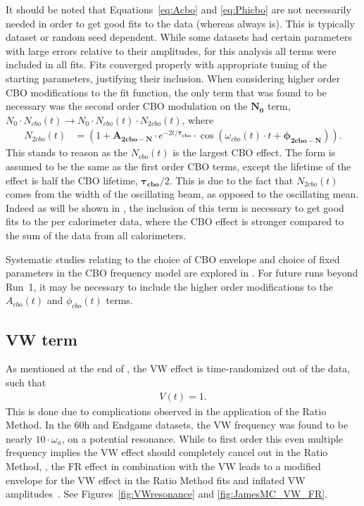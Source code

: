 It should be noted that Equations~\ref{eq:Acbo} and \ref{eq:Phicbo} are not necessarily needed in order to get good fits to the data (whereas  always is). This is typically dataset or random seed dependent. While some datasets had certain parameters with large errors relative to their amplitudes, for this analysis all terms were included in all fits. Fits converged properly with appropriate tuning of the starting parameters, justifying their inclusion. When considering higher order CBO modifications to the fit function, the only term that was found to be necessary was the second order CBO modulation on the $\boldsymbol{N_{0}}$ term, $N_{0} \cdot N_{cbo}(t) \rightarrow N_{0} \cdot N_{cbo}(t) \cdot  N_{2cbo}(t)$, where
    \begin{align}
        N_{2cbo}(t) &= (1 + \boldsymbol{A_{2cbo-N}} \cdot e^{-2t/\boldsymbol{\tau_{cbo}}} \cdot \cos(\omega_{cbo}(t) \cdot t + \boldsymbol{\phi_{2cbo-N}})). \label{eq:N2cbo}
    \end{align}
This stands to reason as the $N_{cbo}(t)$ is the largest CBO effect. The form is assumed to be the same as the first order CBO terms, except the lifetime of the effect is half the CBO lifetime, $\boldsymbol{\tau_{cbo}}/2$. This is due to the fact that $N_{2cbo}(t)$ comes from the width of the oscillating beam, as opposed to the oscillating mean. Indeed as will be shown in , the inclusion of this term is necessary to get good fits to the per calorimeter data, where the CBO effect is stronger compared to the sum of the data from all calorimeters. 




Systematic studies relating to the choice of CBO envelope and choice of fixed parameters in the CBO frequency model are explored in . For future runs beyond Run~1, it may be necessary to include the higher order modifications to the $A_{cbo}(t)$ and $\phi_{cbo}(t)$ terms.



\subsection{VW term}
\label{sub:vw_term}

As mentioned at the end of , the VW effect is time-randomized out of the data, such that 
    \begin{align}
        V(t) = 1. 
    \end{align}
This is done due to complications observed in the application of the Ratio Method. In the 60h and Endgame datasets, the VW frequency was found to be nearly $10 \cdot \omega_{a}$, on a potential resonance. While to first order this even multiple frequency implies the VW effect should completely cancel out in the Ratio Method, , the FR effect in combination with the VW leads to a modified envelope for the VW effect in the Ratio Method fits and inflated VW amplitudes~\cite{VWinRatio}. See Figures~\ref{fig:VWresonance} and \ref{fig:JamesMC_VW_FR}.

